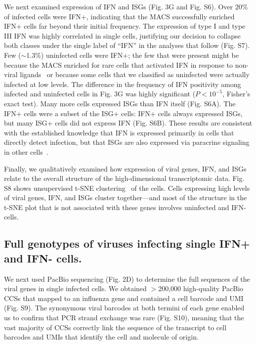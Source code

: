 \documentclass[]{article}
\begin{document}
We next examined expression of IFN and ISGs (Fig. 3G and Fig. S6).
Over 20\% of infected cells were IFN+, indicating that the MACS successfully enriched IFN+ cells far beyond their initial frequency.
The expression of type I and type III IFN was highly correlated in single cells, justifying our decision to collapse both classes under the single label of ``IFN'' in the analyses that follow (Fig. S7).
Few ($\sim$1.3\%) uninfected cells were IFN+; the few that were present might be because the MACS enriched for rare cells that activated IFN in response to non-viral ligands~\cite{dhir2018mitochondrial, benitez2015vivo, chiang2018viral} or because some cells that we classified as uninfected were actually infected at low levels.
The difference in the frequency of IFN positivity among infected and uninfected cells in Fig. 3G was highly significant ($P < 10^{-5}$, Fisher's exact test).
Many more cells expressed ISGs than IFN itself (Fig. S6A).
The IFN+ cells were a subset of the ISG+ cells: IFN+ cells always expressed ISGs, but many ISG+ cells did not express IFN (Fig. S6B).
These results are consistent with the established knowledge that IFN is expressed primarily in cells that directly detect infection, but that ISGs are also expressed via paracrine signaling in other cells~\cite{stetson2006type,honda2006type}.

Finally, we qualitatively examined how expression of viral genes, IFN, and ISGs relate to the overall structure of the high-dimensional transcriptomic data.
Fig. S8 shows unsupervised t-SNE clustering~\cite{maaten2008visualizing} of the cells.
Cells expressing high levels of viral genes, IFN, and ISGs cluster together---and most of the structure in the t-SNE plot that is not associated with these genes involves uninfected and IFN- cells.

\subsection*{Full genotypes of viruses infecting single IFN+ and IFN- cells.}

We next used PacBio sequencing (Fig. 2D) to determine the full sequences of the viral genes in single infected cells.
We obtained $>$200,000 high-quality PacBio CCSs that mapped to an influenza gene and contained a cell barcode and UMI (Fig. S9).
The synonymous viral barcodes at both termini of each gene enabled us to confirm that PCR strand exchange was rare (Fig. S10), meaning that the vast majority of CCSs correctly link the sequence of the transcript to cell barcodes and UMIs that identify the cell and molecule of origin.
\end{document}
